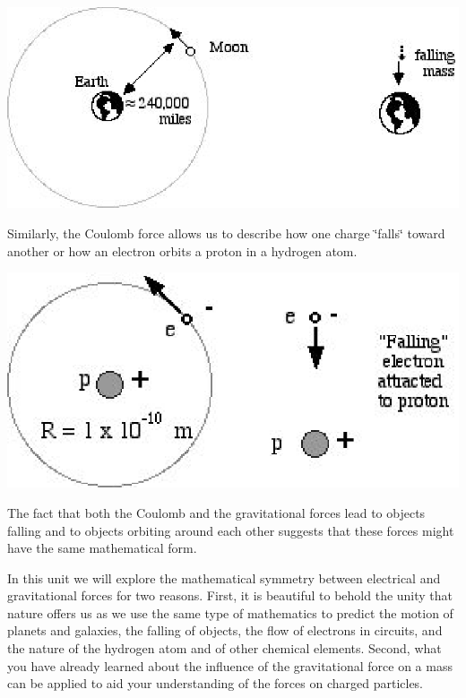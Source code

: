 \vspace{0.3cm}
{\par\centering \includegraphics{elec_grav_fig1.eps} \par}
\vspace{0.3cm}

Similarly, the Coulomb force allows us to describe how one charge \char`\"{}falls\char`\"{}
toward another or how an electron orbits a proton in a hydrogen atom. 

\vspace{0.3cm}
{\par\centering \includegraphics{elec_grav_fig2.eps} \par}
\vspace{0.3cm}

The fact that both the Coulomb and the gravitational forces lead to objects
falling and to objects orbiting around each other suggests that these forces
might have the same mathematical form. 

In this unit we will explore the mathematical symmetry between electrical and
gravitational forces for two reasons. First, it is beautiful to behold the unity
that nature offers us as we use the same type of mathematics to predict the
motion of planets and galaxies, the falling of objects, the flow of electrons
in circuits, and the nature of the hydrogen atom and of other chemical elements.
Second, what you have already learned about the influence of the gravitational
force on a mass can be applied to aid your understanding of the forces on charged
particles. 

